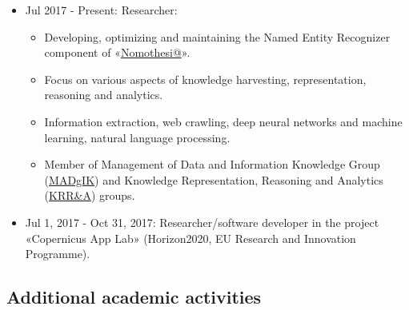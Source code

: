 \documentclass[a4paper,oneside,11pt]{article}
\begin{document}
\begin{itemize}

\item Jul 2017 - Present: Researcher:
	\begin{itemize}

	\item Developing, optimizing and maintaining the Named Entity Recognizer component of «\href{http://legislation.di.uoa.gr}{Nomothesi@}».

	\item Focus on various aspects of knowledge harvesting, representation, reasoning and analytics.

	\item Information extraction, web crawling, deep neural networks and machine learning, natural language processing.

	\item Member of Management of Data and Information Knowledge Group (\href{http://www.madgik.di.uoa.gr}{MADgIK}) and Knowledge Representation, Reasoning and Analytics (\href{http://kr.di.uoa.gr/}{KRR\&A}) groups.

	\end{itemize}

\item Jul 1, 2017 - Oct 31, 2017: Researcher/software developer in the project «Copernicus App Lab» (Horizon2020, EU Research and Innovation Programme).

\end{itemize}

\subsection*{Additional academic activities}
\end{document}
